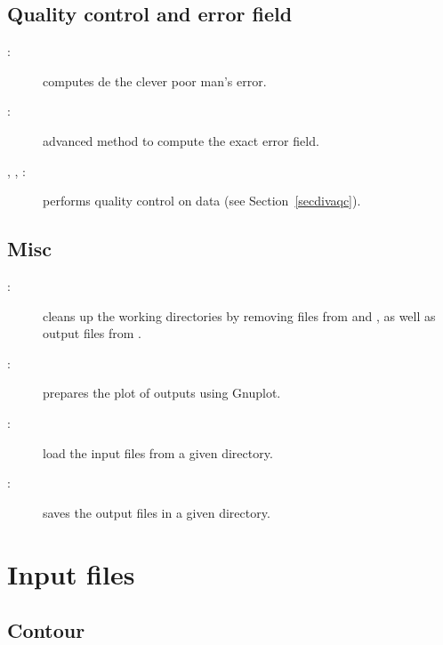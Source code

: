 \subsection{Quality control and error field}

\begin{description}
\item[:] computes de the clever poor man's error.
\item[:] advanced method to compute the exact error field.
\item[, , :] performs quality control on data (see Section~\ref{secdivaqc}).
\end{description}

\subsection{Misc}

\begin{description}
\item[:] cleans up the working directories by removing  files from  and , as well as output files from .
\item[:] prepares the plot of outputs using Gnuplot.
\item[:] load the input files from a given directory.
\item[:] saves the output files in a given directory.
\end{description}

\section{Input files}

\subsection{Contour\label{contourdiva}}

